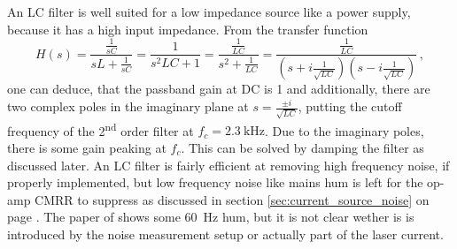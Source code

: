 An LC filter is well suited for a low impedance source like a power supply, because it has a high input impedance. From the transfer function
\begin{equation}
    H(s) = \frac{\frac{1}{sC}}{sL + \frac{1}{sC}} = \frac{1}{s^2LC +1} = \frac{\frac{1}{LC}}{s^2 + \frac{1}{LC}} = \frac{\frac{1}{LC}}{\left(s+i\frac{1}{\sqrt{LC}}\right)\left(s-i\frac{1}{\sqrt{LC}}\right)}\,, \label{eqn:transfer_function_lc_filter}
\end{equation}
one can deduce, that the passband gain at DC is \num{1} and additionally, there are two complex poles in the imaginary plane at $s = \frac{\pm i}{\sqrt{LC}}$, putting the cutoff frequency of the 2\textsuperscript{nd} order filter at $f_c = \qty{2.3}{\kHz}$. Due to the imaginary poles, there is some gain peaking at $f_c$. This can be solved by damping the filter as discussed later. An LC filter is fairly efficient at removing high frequency noise, if properly implemented, but low frequency noise like mains hum is left for the op-amp CMRR to suppress as discussed in section \ref{sec:current_source_noise} on page \pageref{sec:current_source_noise}. The paper of \citeauthor{libbrecht_hall} \cite{libbrecht_hall} shows some \qty{60}{\Hz} hum, but it is not clear wether is is introduced by the noise measurement setup or actually part of the laser current.

